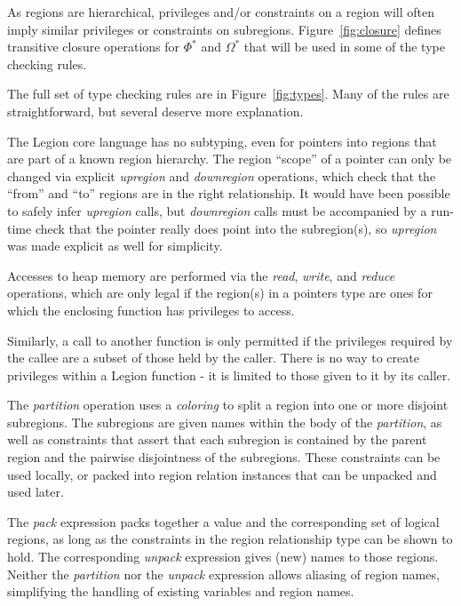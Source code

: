As regions are hierarchical, privileges and/or constraints on a region will often imply similar
privileges or constraints on subregions.  Figure~\ref{fig:closure} defines transitive closure
operations for $\Phi^*$ and $\Omega^*$ that will be used in some of the type checking rules.

The full set of type checking rules are in Figure~\ref{fig:types}.  Many of the rules are 
straightforward, but several deserve more explanation.

The Legion core language has no subtyping, even for pointers into regions that are part of a 
known region hierarchy.  The region ``scope'' of a pointer can only be changed via explicit
{\em upregion} and {\em downregion} operations, which check that the ``from'' and ``to'' regions
are in the right relationship.  It would have been possible to safely infer {\em upregion} calls,
but {\em downregion} calls must be accompanied by a run-time check that the pointer really does
point into the subregion(s), so {\em upregion} was made explicit as well for simplicity.

Accesses to heap memory are performed via the {\em read}, {\em write}, and {\em reduce}
operations, which are only legal if the region(s) in a pointers type are ones for which the
enclosing function has privileges to access.

Similarly, a call to another function is only permitted if the privileges required by the 
callee are a subset of those held by the caller.  There is no way to create privileges within
a Legion function - it is limited to those given to it by its caller.

The {\em partition} operation uses a {\em coloring} to split a region into one or more
disjoint subregions.  The subregions are given names within the body of the {\em partition},
as well as constraints that assert that each subregion is contained by the parent region and
the pairwise disjointness of the subregions.  These constraints can be used locally, or packed
into region relation instances that can be unpacked and used later.

The {\em pack} expression packs together a value and the corresponding set of logical regions,
as long as the constraints in the region relationship type can be shown to hold.  The
corresponding {\em unpack} expression gives (new) names to those regions.  Neither the 
{\em partition} nor the {\em unpack} expression allows aliasing of region names, simplifying the
handling of existing variables and region names.

